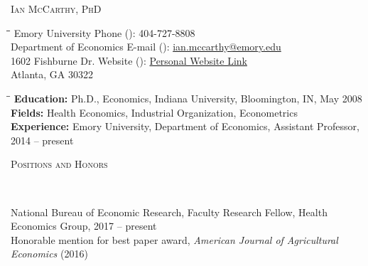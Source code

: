 \documentclass[9pt]{article}
\newenvironment{changemargin}[2]{%
  \begin{list}{}{%
    \setlength{\topsep}{0pt}%
    \setlength{\leftmargin}{#1}%
    \setlength{\rightmargin}{#2}%
    \setlength{\listparindent}{\parindent}%
    \setlength{\itemindent}{\parindent}%
    \setlength{\parsep}{\parskip}%
  }%
  \item[]}{\end{list}
}
\newcommand{\lineover}{
	\begin{changemargin}{-0.05in}{-0.05in}
		\vspace*{-8pt}
		\hrulefill \\
		\vspace*{-2pt}
	\end{changemargin}
}
\newcommand{\header}[1]{
	\begin{changemargin}{-0.5in}{-0.5in}
	\scshape{#1}\\
  	\lineover
	\end{changemargin}
}
\newcommand{\contact}[8]{
	\begin{changemargin}{-0.5in}{-0.5in}
    \begin{center}
    {\Large \scshape{#1}} \\
    \parbox{0cm}{
    \begin{tabbing}
        \hspace{1.8in}\= \hspace{.9in}\= \hspace{1.7in}\=\kill %
        {#2} \>Phone (\Telefon): \> {#3} \\
        {#4} \>E-mail (\Letter): \> {#5} \\
        {#6} \>Website (\MVAt):  \> {#7} \\
        {#8}
    \end{tabbing}}
    \end{center}
    \end{changemargin}
}
\newenvironment{body} {
	\vspace*{-16pt}
	\begin{changemargin}{-0.25in}{-0.5in}
  }	
	{\end{changemargin}
}
\begin{document}
\thispagestyle{firststyle}

\contact{Ian McCarthy, PhD}{Emory University}{404-727-8808}{Department of Economics}{\href{mailto:ian.mccarthy@emory.edu}{ian.mccarthy@emory.edu}}{1602 Fishburne Dr.}{\href{www.ianmccarthyecon.com}{Personal Website Link}}{Atlanta, GA 30322}
\vspace{-.1in}

\begin{tabbing}
    \hspace{1in}\= \hspace{5in}\=\kill %
    \textbf{Education:} \> Ph.D., Economics, Indiana University, Bloomington, IN, May 2008 \\
    \textbf{Fields:} \> Health Economics, Industrial Organization, Econometrics \\
    \textbf{Experience:} \> Emory University, Department of Economics, Assistant Professor, 2014 -- present \\
\end{tabbing}
\vspace{-.2in}

\header{Positions and Honors}
\begin{body}
  \vspace{13pt}
  National Bureau of Economic Research, Faculty Research Fellow, Health Economics Group, 2017 -- present \\
  Honorable mention for best paper award, \textit{American Journal of Agricultural Economics} (2016)
\end{body}
\smallskip
\end{document}

